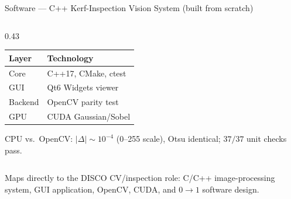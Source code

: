\documentclass[aspectratio=169,11pt]{beamer}
\begin{document}
\begin{frame}[shrink=10]{Software --- C++ Kerf-Inspection Vision System (built from scratch)}
\begin{columns}[T]
\begin{column}{0.43\textwidth}
      \vspace{0.1em}
      \centering
      \begin{tabular}{ll}
        \toprule
        Layer   & Technology \\
        \midrule
        Core    & C++17, CMake, ctest \\
        GUI     & Qt6 Widgets viewer \\
        Backend & OpenCV parity test \\
        GPU     & CUDA Gaussian/Sobel \\
        \bottomrule
      \end{tabular}

      \vspace{0.4em}
      \raggedright
      {\footnotesize CPU vs.\ OpenCV: $|\Delta|\sim10^{-4}$ (0--255 scale),
        Otsu identical; $37/37$ unit checks pass.}
    \end{column}
  \end{columns}
  \vspace{0.3em}
  {\footnotesize\textcolor{discogray}{Maps directly to the DISCO CV/inspection
    role: C/C++ image-processing system, GUI application, OpenCV, CUDA, and
    $0\!\to\!1$ software design.}}
\end{frame}
\end{document}
